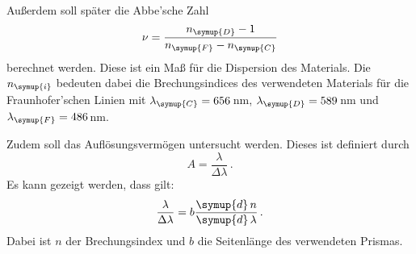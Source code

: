 Außerdem soll später die Abbe'sche Zahl
\begin{equation}
  \nu=\frac{n_{\symup{D}}-1}{n_{\symup{F}}-n_{\symup{C}}}
\end{equation}
berechnet werden. Diese ist ein Maß für die Dispersion des Materials.
Die $n_{\symup{i}}$ bedeuten dabei die Brechungsindices des
verwendeten Materials für die Fraunhofer'schen Linien mit $\lambda_{\symup{C}}=656\,$nm,
$\lambda_{\symup{D}}=589\,$nm und $\lambda_{\symup{F}}=486\,$nm.

Zudem soll das Auflösungsvermögen untersucht werden. Dieses ist definiert durch
\begin{equation}
  A=\frac{\lambda}{\Delta\lambda} \,.
\end{equation}
Es kann gezeigt werden, dass gilt:
\begin{equation}
  \frac{\lambda}{\Delta\lambda}=b\frac{\symup{d}\,n}{\symup{d}\,\lambda} \,.
\end{equation}
Dabei ist $n$ der Brechungsindex und $b$ die Seitenlänge des verwendeten Prismas.
